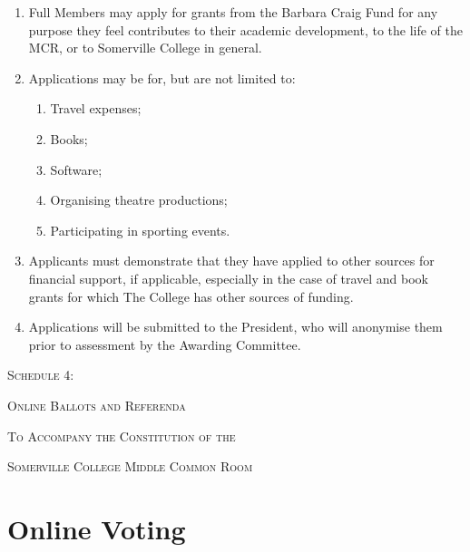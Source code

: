 \documentclass[11pt, a4paper]{article}
\begin{document}
\begin{enumerate}
    \item Full Members may apply for grants from the Barbara Craig Fund for any purpose they feel contributes to their academic development, to the life of the MCR, or to Somerville College in general.
    \item Applications may be for, but are not limited to:
    	\begin{enumerate}
        	\item Travel expenses;
            \item Books;
            \item Software;
            \item Organising theatre productions;
            \item Participating in sporting events.
        \end{enumerate}
    \item Applicants must demonstrate that they have applied to other sources for financial support, if applicable, especially in the case of travel and book grants for which The College has other sources of funding.
    \item Applications will be submitted to the President, who will anonymise them prior to  assessment by the Awarding Committee.
\end{enumerate}





\clearpage
\setcounter{section}{0}





\centerline{{\Huge \textsc{Schedule 4:}}}
\vspace{2mm}
\centerline{{\Huge \textsc{Online Ballots and Referenda}}}
\vspace{2mm}
\centerline{{\Large \textsc{To Accompany the Constitution of the}}}
\vspace{2mm}
\centerline{{\Large \textsc{Somerville College Middle Common Room}}}





\section{Online Voting}
\label{sec:online_voting}
\end{document}
